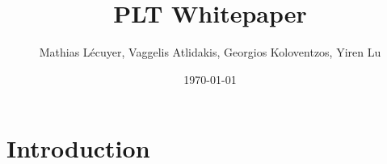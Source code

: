 \documentclass[12pt]{article}
\title{PLT Whitepaper}
\author{Mathias Lécuyer, Vaggelis Atlidakis, Georgios Koloventzos, Yiren Lu}
\date{\today}
\begin{document}
\maketitle

\section{Introduction}
	\subsection{}

	\subsection{}
\section{}
\end{document}
